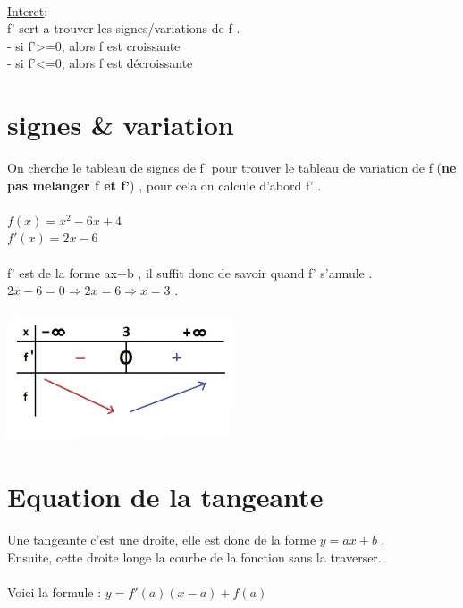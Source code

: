 \documentclass[a4paper,8pt,openany]{book}
\begin{document}
\\
\underline{Interet}:\\
f' sert a trouver les signes/variations de f .\\
- si f'>=0, alors f est croissante \\
- si f'<=0, alors f est décroissante \\

\section{signes \& variation}
On cherche le tableau de signes de f' pour trouver le tableau de variation de f (\textbf{ne pas melanger f et f'}) , pour cela on calcule d'abord f' .\\
\\
$f(x)=x^2-6x+4$\\
$f'(x)=2x-6$\\
\\
f' est de la forme ax+b , il suffit donc de savoir quand f' s'annule . $2x-6=0 \Rightarrow 2x=6 \Rightarrow x=3$ .\\
\\
\includegraphics[width=0.5\textwidth , center]{img/tableau-signe-variation.png}


\section{Equation de la tangeante}
Une tangeante c’est une droite, elle est donc de la forme $y = ax + b$ .\\
Ensuite, cette droite \« longe \» la courbe de la fonction sans la traverser.\\
\\
Voici la formule : $y = f'(a)(x-a)+f(a)$\\
\\
\end{document}
